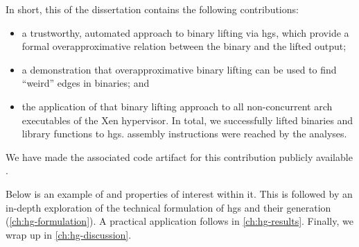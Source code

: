 In short, this  of the dissertation contains the following contributions:
\begin{itemize}
  \item a trustworthy, automated approach to binary lifting via \acp{hg}, which provide a formal overapproximative relation between the binary and the lifted output;
  \item a demonstration that overapproximative binary lifting can be used to find ``weird'' edges in binaries; and
  \item the application of that binary lifting approach to all non-concurrent \gls{arch} executables of the Xen hypervisor.
  In total, we successfully lifted  binaries and  library functions to \acp{hg}.
  assembly instructions were reached by the analyses.
\end{itemize}
\begin{comment}
  The work was developed in collaboration with Dr.~Freek Verbeek, with the case study application being primarily done by me.
\end{comment}
We have made the associated code artifact for this contribution publicly available \autocite{bockenek2022artifact}.

Below is an example of  and properties of interest within it.
This  is followed by an in-depth exploration of the technical formulation of \acp{hg} and their generation (\cref{ch:hg-formulation}).
A practical application follows in \cref{ch:hg-results}.
Finally, we wrap up in \cref{ch:hg-discussion}.


